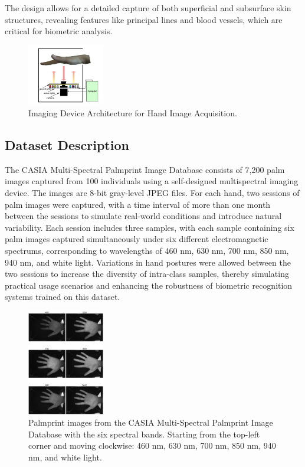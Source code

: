 The design allows for a detailed capture of both superficial and subsurface skin structures, revealing features like principal lines and blood vessels, which are critical for biometric analysis.

\begin{figure}[H]
    \centering
    \includegraphics[width=0.3\textwidth]{./images/device-architecture.png}
    \caption{Imaging Device Architecture for Hand Image Acquisition.}
    \label{fig:device_architecture}
\end{figure}

\subsection{Dataset Description}

The CASIA Multi-Spectral Palmprint Image Database consists of 7,200 palm images captured from 100 individuals using a self-designed multispectral imaging device. The images are 8-bit gray-level JPEG files. For each hand, two sessions of palm images were captured, with a time interval of more than one month between the sessions to simulate real-world conditions and introduce natural variability. Each session includes three samples, with each sample containing six palm images captured simultaneously under six different electromagnetic spectrums, corresponding to wavelengths of 460 nm, 630 nm, 700 nm, 850 nm, 940 nm, and white light. Variations in hand postures were allowed between the two sessions to increase the diversity of intra-class samples, thereby simulating practical usage scenarios and enhancing the robustness of biometric recognition systems trained on this dataset.

\begin{figure}[H]
    \centering
    \includegraphics[width=0.3\textwidth]{./images/spectrums.png}
    \caption{Palmprint images from the CASIA Multi-Spectral Palmprint Image Database with the six spectral bands. Starting from the top-left corner and moving clockwise: 460 nm, 630 nm, 700 nm, 850 nm, 940 nm, and white light.}
    \label{fig:dataset_example}
\end{figure}